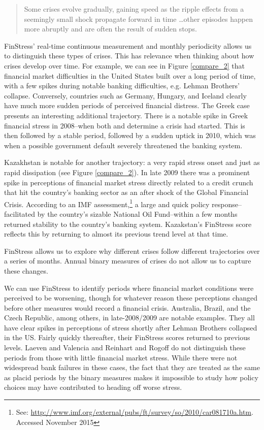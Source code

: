 \documentclass[]{article}
\begin{document}
\begin{quote}
    Some crises evolve gradually, gaining speed as the ripple effects from a seemingly small shock propagate forward in time \ldots other episodes happen more abruptly and are often the result of sudden stops.
\end{quote}

\noindent FinStress' real-time continuous measurement and monthly periodicity allows us to distinguish these types of crises. This has relevance when thinking about how crises develop over time. For example, we can see in Figure \ref{compare_2} that financial market difficulties in the United States built over a long period of time, with a few spikes during notable banking difficulties, e.g. Lehman Brothers' collapse. Conversely, countries such as Germany, Hungary, and Iceland clearly have much more sudden periods of perceived financial distress. The Greek case presents an interesting additional trajectory. There is a notable spike in Greek financial stress in 2008--when both \cite{Reinhart2009} and \cite{laeven2013} determine a crisis had started. This is then followed by a stable period, followed by a sudden uptick in 2010, which was when a possible government default severely threatened the banking system.

Kazakhstan is notable for another trajectory: a very rapid stress onset and just as rapid dissipation (see Figure \ref{compare_2}). In late 2009 there was a prominent spike in perceptions of financial market stress directly related to a credit crunch that hit the country's banking sector as an after shock of the Global Financial Crisis. According to an IMF assessment,\footnote{See: \url{http://www.imf.org/external/pubs/ft/survey/so/2010/car081710a.htm}. Accessed November 2015} a large and quick policy response--facilitated by the country's sizable National Oil Fund--within a few months returned stability to the country's banking system. Kazakstan's FinStress score reflects this by returning to almost its previous trend level at that time.

FinStress allows us to explore why different crises follow different trajectories over a series of months. Annual binary measures of crises do not allow us to capture these changes.

We can use FinStress to identify periods where financial market conditions were perceived to be worsening, though for whatever reason these perceptions changed before other measures would record a financial crisis. Australia, Brazil, and the Czech Republic, among others, in late-2008/2009 are notable examples. They all have clear spikes in perceptions of stress shortly after Lehman Brothers collapsed in the US. Fairly quickly thereafter, their FinStress scores returned to previous levels. Laeven and Valencia and Reinhart and Rogoff do not distinguish these periods from those with little financial market stress. While there were not widespread bank failures in these cases, the fact that they are treated as the same as placid periods by the binary measures makes it impossible to study how policy choices may have contributed to heading off worse stress.
\end{document}
